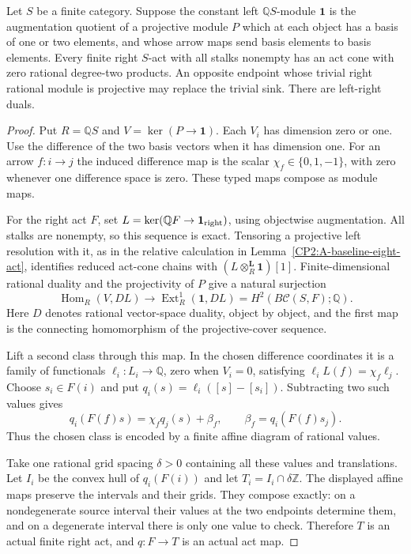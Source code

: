 \begin{lemma}
\label{CP2:A-baseline-binary-projective-cover}
Let $S$ be a finite category.  Suppose the constant left
$\mathbb QS$-module $\mathbf1$ is the augmentation quotient
of a projective module $P$ which at each object has a basis
of one or two elements, and whose arrow maps send basis
elements to basis elements.  Every finite right $S$-act
with all stalks nonempty has an act cone with zero rational
degree-two products.  An opposite endpoint whose trivial
right rational module is projective may replace the trivial
sink.  There are left-right duals.
\end{lemma}
\begin{proof}
Put $R=\mathbb QS$ and $V=\ker(P\to\mathbf1)$.
Each $V_i$ has dimension zero or one.  Use the difference
of the two basis vectors when it has dimension one.
For an arrow $f:i\to j$ the induced difference map is
the scalar $\chi_f\in\{0,1,-1\}$, with zero whenever
one difference space is zero.  These typed maps compose
as module maps.

For the right act $F$, set
$L=\ker(\mathbb QF\to\mathbf1_{\rm right})$, using
objectwise augmentation.  All stalks are nonempty, so
this sequence is exact.  Tensoring a projective left
resolution with it, as in the relative calculation in
Lemma~\ref{CP2:A-baseline-eight-act}, identifies reduced
act-cone chains with $(L\otimes_R^{\mathbf L}\mathbf1)[1]$.
Finite-dimensional rational duality and the projectivity
of $P$ give a natural surjection
\[
 \operatorname{Hom}_R(V,DL)\longrightarrow
 \operatorname{Ext}^1_R(\mathbf1,DL)
  =H^2(B\mathcal C(S,F);\mathbb Q).
\]
Here $D$ denotes rational vector-space duality, object by
object, and the first map is the connecting homomorphism
of the projective-cover sequence.

Lift a second class through this map.  In the chosen
difference coordinates it is a family of functionals
$\ell_i:L_i\to\mathbb Q$, zero when $V_i=0$, satisfying
$\ell_i L(f)=\chi_f\ell_j$.  Choose $s_i\in F(i)$ and
put $q_i(s)=\ell_i([s]-[s_i])$.  Subtracting two such
values gives
\[
 q_i(F(f)s)=\chi_f q_j(s)+\beta_f,
 \qquad \beta_f=q_i(F(f)s_j).
\]
Thus the chosen class is encoded by a finite affine
diagram of rational values.

Take one rational grid spacing $\delta>0$ containing
all these values and translations.  Let $I_i$ be the
convex hull of $q_i(F(i))$ and let
$T_i=I_i\cap\delta\mathbb Z$.  The displayed affine
maps preserve the intervals and their grids.  They
compose exactly: on a nondegenerate source interval
their values at the two endpoints determine them, and
on a degenerate interval there is only one value to
check.  Therefore $T$ is an actual finite right act,
and $q:F\to T$ is an actual act map.


\end{proof}
